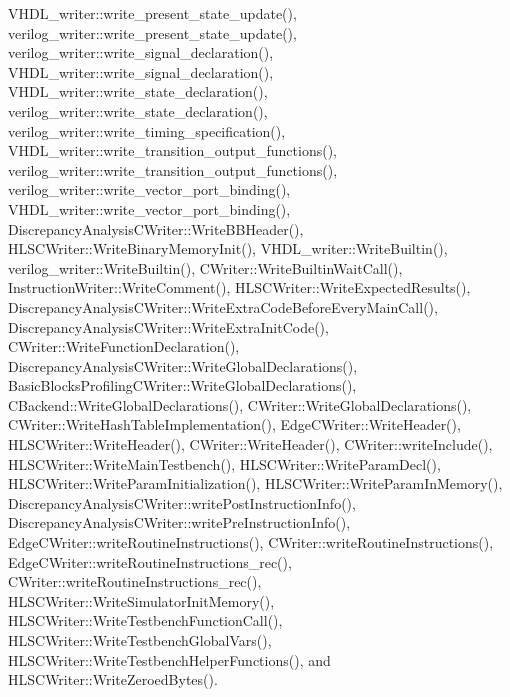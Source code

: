 V\+H\+D\+L\+\_\+writer\+::write\+\_\+present\+\_\+state\+\_\+update(), verilog\+\_\+writer\+::write\+\_\+present\+\_\+state\+\_\+update(), verilog\+\_\+writer\+::write\+\_\+signal\+\_\+declaration(), V\+H\+D\+L\+\_\+writer\+::write\+\_\+signal\+\_\+declaration(), V\+H\+D\+L\+\_\+writer\+::write\+\_\+state\+\_\+declaration(), verilog\+\_\+writer\+::write\+\_\+state\+\_\+declaration(), verilog\+\_\+writer\+::write\+\_\+timing\+\_\+specification(), V\+H\+D\+L\+\_\+writer\+::write\+\_\+transition\+\_\+output\+\_\+functions(), verilog\+\_\+writer\+::write\+\_\+transition\+\_\+output\+\_\+functions(), verilog\+\_\+writer\+::write\+\_\+vector\+\_\+port\+\_\+binding(), V\+H\+D\+L\+\_\+writer\+::write\+\_\+vector\+\_\+port\+\_\+binding(), Discrepancy\+Analysis\+C\+Writer\+::\+Write\+B\+B\+Header(), H\+L\+S\+C\+Writer\+::\+Write\+Binary\+Memory\+Init(), V\+H\+D\+L\+\_\+writer\+::\+Write\+Builtin(), verilog\+\_\+writer\+::\+Write\+Builtin(), C\+Writer\+::\+Write\+Builtin\+Wait\+Call(), Instruction\+Writer\+::\+Write\+Comment(), H\+L\+S\+C\+Writer\+::\+Write\+Expected\+Results(), Discrepancy\+Analysis\+C\+Writer\+::\+Write\+Extra\+Code\+Before\+Every\+Main\+Call(), Discrepancy\+Analysis\+C\+Writer\+::\+Write\+Extra\+Init\+Code(), C\+Writer\+::\+Write\+Function\+Declaration(), Discrepancy\+Analysis\+C\+Writer\+::\+Write\+Global\+Declarations(), Basic\+Blocks\+Profiling\+C\+Writer\+::\+Write\+Global\+Declarations(), C\+Backend\+::\+Write\+Global\+Declarations(), C\+Writer\+::\+Write\+Global\+Declarations(), C\+Writer\+::\+Write\+Hash\+Table\+Implementation(), Edge\+C\+Writer\+::\+Write\+Header(), H\+L\+S\+C\+Writer\+::\+Write\+Header(), C\+Writer\+::\+Write\+Header(), C\+Writer\+::write\+Include(), H\+L\+S\+C\+Writer\+::\+Write\+Main\+Testbench(), H\+L\+S\+C\+Writer\+::\+Write\+Param\+Decl(), H\+L\+S\+C\+Writer\+::\+Write\+Param\+Initialization(), H\+L\+S\+C\+Writer\+::\+Write\+Param\+In\+Memory(), Discrepancy\+Analysis\+C\+Writer\+::write\+Post\+Instruction\+Info(), Discrepancy\+Analysis\+C\+Writer\+::write\+Pre\+Instruction\+Info(), Edge\+C\+Writer\+::write\+Routine\+Instructions(), C\+Writer\+::write\+Routine\+Instructions(), Edge\+C\+Writer\+::write\+Routine\+Instructions\+\_\+rec(), C\+Writer\+::write\+Routine\+Instructions\+\_\+rec(), H\+L\+S\+C\+Writer\+::\+Write\+Simulator\+Init\+Memory(), H\+L\+S\+C\+Writer\+::\+Write\+Testbench\+Function\+Call(), H\+L\+S\+C\+Writer\+::\+Write\+Testbench\+Global\+Vars(), H\+L\+S\+C\+Writer\+::\+Write\+Testbench\+Helper\+Functions(), and H\+L\+S\+C\+Writer\+::\+Write\+Zeroed\+Bytes().

